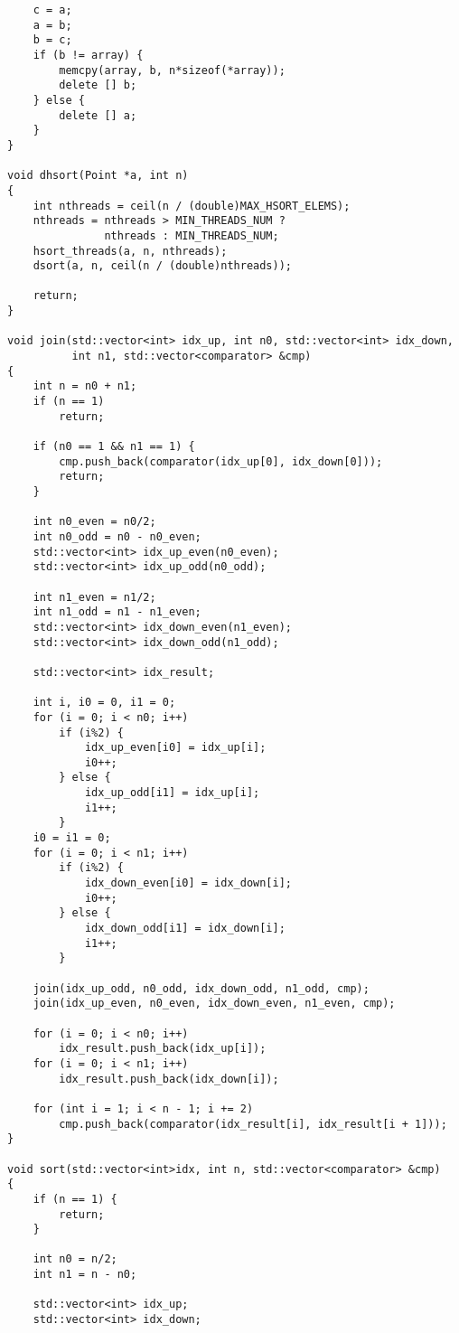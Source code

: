 \documentclass[oneside,final,14pt]{extreport}
\begin{document}
\begin{verbatim}
    c = a;
    a = b;
    b = c;
    if (b != array) {
        memcpy(array, b, n*sizeof(*array));
        delete [] b;
    } else {
        delete [] a;
    }
}

void dhsort(Point *a, int n)
{
    int nthreads = ceil(n / (double)MAX_HSORT_ELEMS);
    nthreads = nthreads > MIN_THREADS_NUM ?
               nthreads : MIN_THREADS_NUM;
    hsort_threads(a, n, nthreads);
    dsort(a, n, ceil(n / (double)nthreads));

    return;
}

void join(std::vector<int> idx_up, int n0, std::vector<int> idx_down,
          int n1, std::vector<comparator> &cmp)
{
    int n = n0 + n1;
    if (n == 1)
        return;

    if (n0 == 1 && n1 == 1) {
        cmp.push_back(comparator(idx_up[0], idx_down[0]));
        return;
    }

    int n0_even = n0/2;
    int n0_odd = n0 - n0_even;
    std::vector<int> idx_up_even(n0_even);
    std::vector<int> idx_up_odd(n0_odd);

    int n1_even = n1/2;
    int n1_odd = n1 - n1_even;
    std::vector<int> idx_down_even(n1_even);
    std::vector<int> idx_down_odd(n1_odd);

    std::vector<int> idx_result;

    int i, i0 = 0, i1 = 0;
    for (i = 0; i < n0; i++)
        if (i%2) {
            idx_up_even[i0] = idx_up[i];
            i0++;
        } else {
            idx_up_odd[i1] = idx_up[i];
            i1++;
        }
    i0 = i1 = 0;
    for (i = 0; i < n1; i++)
        if (i%2) {
            idx_down_even[i0] = idx_down[i];
            i0++;
        } else {
            idx_down_odd[i1] = idx_down[i];
            i1++;
        }

    join(idx_up_odd, n0_odd, idx_down_odd, n1_odd, cmp);
    join(idx_up_even, n0_even, idx_down_even, n1_even, cmp);

    for (i = 0; i < n0; i++)
        idx_result.push_back(idx_up[i]);
    for (i = 0; i < n1; i++)
        idx_result.push_back(idx_down[i]);

    for (int i = 1; i < n - 1; i += 2)
        cmp.push_back(comparator(idx_result[i], idx_result[i + 1]));
}

void sort(std::vector<int>idx, int n, std::vector<comparator> &cmp)
{
    if (n == 1) {
        return;
    }

    int n0 = n/2;
    int n1 = n - n0;

    std::vector<int> idx_up;
    std::vector<int> idx_down;


\end{verbatim}
\end{document}

